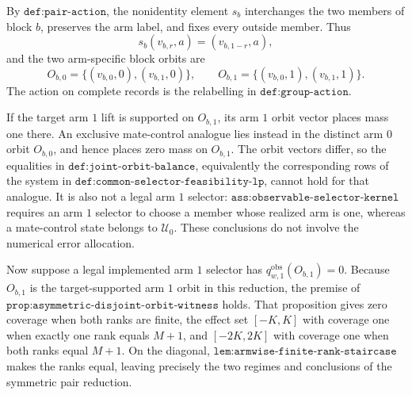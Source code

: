 By \(\texttt{def:pair-action}\), the nonidentity element \(s_b\) interchanges the two members of block \(b\), preserves the arm label, and fixes every outside member. Thus
\[
s_b(v_{b,r},a)=(v_{b,1-r},a),
\]
and the two arm-specific block orbits are
\[
O_{b,0}=\{(v_{b,0},0),(v_{b,1},0)\},\qquad O_{b,1}=\{(v_{b,0},1),(v_{b,1},1)\}.
\tag{1}
\]
The action on complete records is the relabelling in \(\texttt{def:group-action}\).

If the target arm \(1\) lift is supported on \(O_{b,1}\), its arm \(1\) orbit vector places mass one there. An exclusive mate-control analogue lies instead in the distinct arm \(0\) orbit \(O_{b,0}\), and hence places zero mass on \(O_{b,1}\). The orbit vectors differ, so the equalities in \(\texttt{def:joint-orbit-balance}\), equivalently the corresponding rows of the system in \(\texttt{def:common-selector-feasibility-lp}\), cannot hold for that analogue. It is also not a legal arm \(1\) selector: \(\texttt{ass:observable-selector-kernel}\) requires an arm \(1\) selector to choose a member whose realized arm is one, whereas a mate-control state belongs to \(\mathcal U_0\). These conclusions do not involve the numerical error allocation.

Now suppose a legal implemented arm \(1\) selector has \(q^{\mathrm{obs}}_{w,1}(O_{b,1})=0\). Because \(O_{b,1}\) is the target-supported arm \(1\) orbit in this reduction, the premise of \(\texttt{prop:asymmetric-disjoint-orbit-witness}\) holds. That proposition gives zero coverage when both ranks are finite, the effect set \([-K,K]\) with coverage one when exactly one rank equals \(M+1\), and \([-2K,2K]\) with coverage one when both ranks equal \(M+1\). On the diagonal, \(\texttt{lem:armwise-finite-rank-staircase}\) makes the ranks equal, leaving precisely the two regimes and conclusions of the symmetric pair reduction.